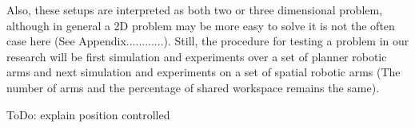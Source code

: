 Also, these setups are interpreted as both two or three dimensional problem, although in general a 2D problem may be more easy to solve it is not the often case here (See Appendix............). Still, the procedure for testing a problem in our research will be first simulation and experiments over a set of planner robotic arms and next simulation and experiments on a set of spatial robotic arms (The number of arms and the percentage of shared workspace remains the same). 

%


ToDo: explain position controlled
  